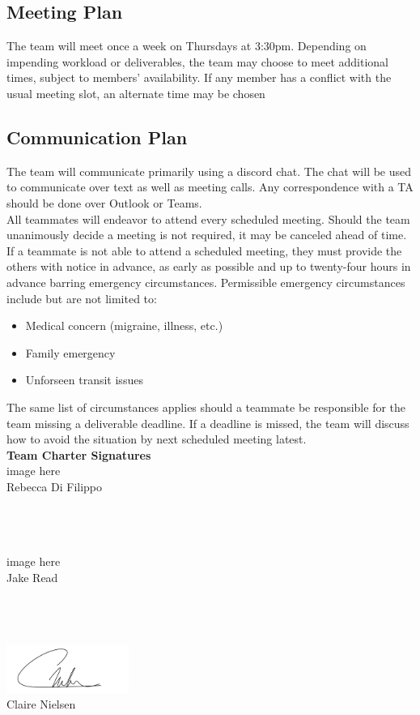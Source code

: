 \documentclass{article}
\begin{document}
\subsection{Meeting Plan}

The team will meet once a week on Thursdays at 3:30pm. Depending on impending workload or deliverables, the team may choose to meet additional times, subject to members' availability. If any member has a conflict with the usual meeting slot, an alternate time may be chosen

\subsection{Communication Plan}

The team will communicate primarily using a discord chat. The chat will be used to communicate over text as well as meeting calls. Any correspondence with a TA should be done over Outlook or Teams. \\

All teammates will endeavor to attend every scheduled meeting. Should the team unanimously decide a meeting is not required, it may be canceled ahead of time. If a teammate is not able to attend a scheduled meeting, they must provide the others with notice in advance, as early as possible and up to twenty-four hours in advance barring emergency circumstances. Permissible emergency circumstances include but are not limited to: \\

\begin{itemize}
    \item Medical concern (migraine, illness, etc.)
    \item Family emergency
    \item Unforseen transit issues \\
\end{itemize}

The same list of circumstances applies should a teammate be responsible for the team missing a deliverable deadline. If a deadline is missed, the team will discuss how to avoid the situation by next scheduled meeting latest. \\

\textbf{Team Charter Signatures}\\

image here\\
Rebecca Di Filippo \\ 
\date{\today}\\ \\ \\ 

image here\\
Jake Read\\
\date{\today }\\ \\ \\ 

\includegraphics[width=0.3\textwidth]{signature_claire}\\
Claire Nielsen\\
\date{\today}
\end{document}
